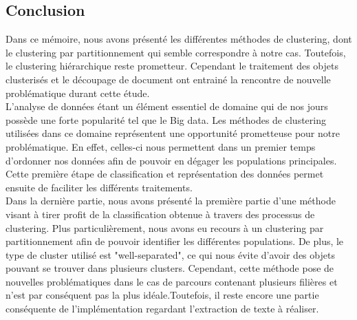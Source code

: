 \documentclass[memoire.tex]{subfiles}
\begin{document}
\subsection{Conclusion}
Dans ce mémoire, nous avons présenté les différentes méthodes de clustering, dont le clustering par partitionnement qui semble correspondre à notre cas. Toutefois, le clustering hiérarchique reste prometteur. Cependant le traitement des objets clusterisés et le découpage de document ont entrainé la rencontre de nouvelle problématique durant cette étude.\\
L'analyse de données étant un élément essentiel de domaine qui de nos jours possède une forte popularité tel que le Big data. Les méthodes de clustering utilisées dans ce domaine représentent une opportunité prometteuse pour notre problématique. En effet, celles-ci nous permettent dans un premier temps d'ordonner nos données afin de pouvoir en dégager les populations principales. Cette première étape de classification et représentation des données permet ensuite de faciliter les différents traitements.\\
Dans la dernière partie, nous avons présenté la première partie d'une méthode visant à tirer profit de la classification obtenue à travers des processus de clustering. Plus particulièrement, nous avons eu recours à un clustering par partitionnement afin de pouvoir identifier les différentes populations. De plus, le type de cluster utilisé est "well-separated", ce qui nous évite d'avoir des objets pouvant se trouver dans plusieurs clusters. Cependant, cette méthode pose de nouvelles problématiques dans le cas de parcours contenant plusieurs filières et n'est par conséquent pas la plus idéale.Toutefois, il reste encore une partie conséquente de l'implémentation regardant l'extraction de texte à réaliser.
\end{document}
